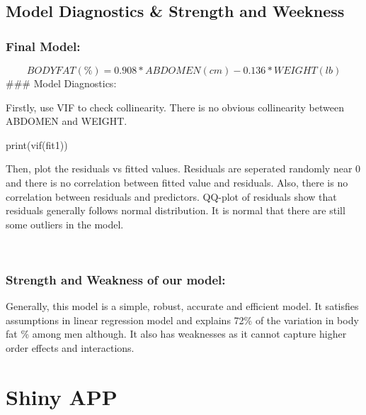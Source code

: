 \documentclass[11pt]{article}
\begin{document}
    
    \hypertarget{model-diagnostics-strength-and-weekness}{%
\subsection{Model Diagnostics \& Strength and
Weekness}\label{model-diagnostics-strength-and-weekness}}

\hypertarget{final-model}{%
\subsubsection{Final Model:}\label{final-model}}

\[BODYFAT (\%) = 0.908*ABDOMEN(cm) - 0.136*WEIGHT(lb)\] \#\#\# Model
Diagnostics:

Firstly, use VIF to check collinearity. There is no obvious collinearity
between ABDOMEN and WEIGHT.

    print(vif(fit1))

    Then, plot the residuals vs fitted values. Residuals are seperated
randomly near 0 and there is no correlation between fitted value and
residuals. Also, there is no correlation between residuals and
predictors. QQ-plot of residuals show that residuals generally follows
normal distribution. It is normal that there are still some outliers in
the model.

    \begin{center}
    \end{center}
    { \hspace*{\fill} \\}
    
    \hypertarget{strength-and-weakness-of-our-model}{%
\subsubsection{Strength and Weakness of our
model:}\label{strength-and-weakness-of-our-model}}

Generally, this model is a simple, robust, accurate and efficient model.
It satisfies assumptions in linear regression model and explains 72\% of
the variation in body fat \% among men although. It also has weaknesses
as it cannot capture higher order effects and interactions.

\hypertarget{shiny-app}{%
\section{Shiny APP}\label{shiny-app}}
\end{document}
